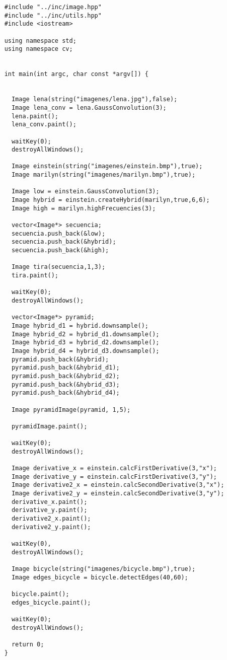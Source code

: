 \documentclass[a4paper, 11pt]{article}
\theoremstyle{definition}
\begin{document}
  \begin{lstlisting}
    #include "../inc/image.hpp"
    #include "../inc/utils.hpp"
    #include <iostream>

    using namespace std;
    using namespace cv;


    int main(int argc, char const *argv[]) {


      Image lena(string("imagenes/lena.jpg"),false);
      Image lena_conv = lena.GaussConvolution(3);
      lena.paint();
      lena_conv.paint();

      waitKey(0);
      destroyAllWindows();

      Image einstein(string("imagenes/einstein.bmp"),true);
      Image marilyn(string("imagenes/marilyn.bmp"),true);

      Image low = einstein.GaussConvolution(3);
      Image hybrid = einstein.createHybrid(marilyn,true,6,6);
      Image high = marilyn.highFrecuencies(3);

      vector<Image*> secuencia;
      secuencia.push_back(&low);
      secuencia.push_back(&hybrid);
      secuencia.push_back(&high);

      Image tira(secuencia,1,3);
      tira.paint();

      waitKey(0);
      destroyAllWindows();

      vector<Image*> pyramid;
      Image hybrid_d1 = hybrid.downsample();
      Image hybrid_d2 = hybrid_d1.downsample();
      Image hybrid_d3 = hybrid_d2.downsample();
      Image hybrid_d4 = hybrid_d3.downsample();
      pyramid.push_back(&hybrid);
      pyramid.push_back(&hybrid_d1);
      pyramid.push_back(&hybrid_d2);
      pyramid.push_back(&hybrid_d3);
      pyramid.push_back(&hybrid_d4);

      Image pyramidImage(pyramid, 1,5);

      pyramidImage.paint();

      waitKey(0);
      destroyAllWindows();

      Image derivative_x = einstein.calcFirstDerivative(3,"x");
      Image derivative_y = einstein.calcFirstDerivative(3,"y");
      Image derivative2_x = einstein.calcSecondDerivative(3,"x");
      Image derivative2_y = einstein.calcSecondDerivative(3,"y");
      derivative_x.paint();
      derivative_y.paint();
      derivative2_x.paint();
      derivative2_y.paint();

      waitKey(0),
      destroyAllWindows();

      Image bicycle(string("imagenes/bicycle.bmp"),true);
      Image edges_bicycle = bicycle.detectEdges(40,60);

      bicycle.paint();
      edges_bicycle.paint();

      waitKey(0);
      destroyAllWindows();

      return 0;
    }

  \end{lstlisting}
\end{document}

